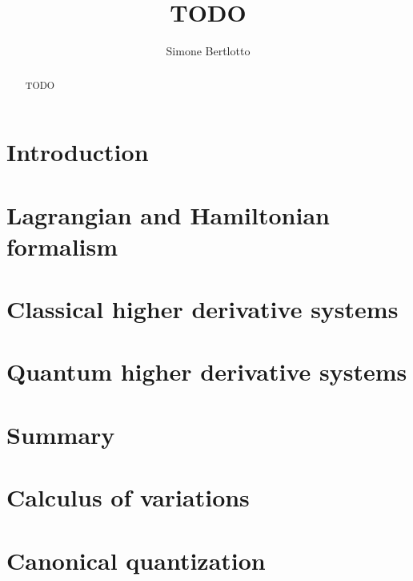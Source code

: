 \documentclass[a4paper]{article}
\title{TODO}
\author{Simone Bertlotto}
\theoremstyle{definition}
\numberwithin{equation}{section}
\begin{document}
  \maketitle

  \begin{abstract}
    TODO
  \end{abstract}

  \newpage

  \section{Introduction}\label{section: introduction}
  

  \section{Lagrangian and Hamiltonian formalism}\label{section: lagrangin and
  hamiltonian formalism}
  

  \section{Classical higher derivative systems}\label{section: classical higher
  derivative systems}
  

  \section{Quantum higher derivative systems}\label{section: quantum higher
  derivative systems}
  

  \section{Summary}\label{section: summary}
  

  \newpage

  \begin{appendices}
    \section{Calculus of variations}\label{appendix: calculus of variation}
    

    \section{Canonical quantization}\label{appendix:canonical_quantization}
    
  \end{appendices}

  \newpage

  \printbibliography{}
\end{document}
